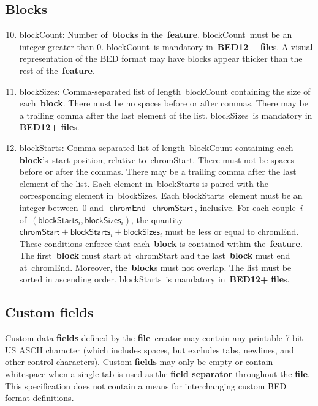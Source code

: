 \documentclass[11pt]{article}
\begin{document}
\subsection{Blocks}
\begin{enumerate}
  \setcounter{enumi}{9}

\item \textsf{blockCount}: Number of~\textbf{block}s in the~\textbf{feature}.
  \textsf{blockCount}~must be an integer greater than 0.
  \textsf{blockCount}~is mandatory in~\textbf{BED12+}~\textbf{file}s.
  A visual representation of the \ac{BED} format may have blocks appear thicker than the rest of the~\textbf{feature}.

\item \textsf{blockSizes}: Comma-separated list of length~\textsf{blockCount} containing the size of each~\textbf{block}.
  There must be no spaces before or after commas.
  There may be a trailing comma after the last element of the list.
  \textsf{blockSizes}~is mandatory in \textbf{BED12+} \textbf{file}s.

\item \textsf{blockStarts}: Comma-separated list of length~\textsf{blockCount} containing each \textbf{block}'s~start position, relative to~\textsf{chromStart}.
  There must not be spaces before or after the commas.
  There may be a trailing comma after the last element of the list.
  Each element in~\textsf{blockStarts} is paired with the corresponding element in~\textsf{blockSizes}.
  Each \textsf{blockStarts}~element must be an integer between~0 and~$\textsf{chromEnd} - \textsf{chromStart}$, inclusive.
  For each couple~$i$ of~$(\textsf{blockStarts}_i, \textsf{blockSizes}_i)$, the quantity~$\textsf{chromStart} + \textsf{blockStarts}_i + \textsf{blockSizes}_i$ must be less or equal to \textsf{chromEnd}.
  These conditions enforce that each~\textbf{block} is contained within the~\textbf{feature}.
  The first~\textbf{block} must start at~\textsf{chromStart} and the last~\textbf{block} must end at~\textsf{chromEnd}.
  Moreover, the~\textbf{block}s must not overlap.
  The list must be sorted in ascending order.
  \textsf{blockStarts}~is mandatory in~\textbf{BED12+} \textbf{file}s.
\end{enumerate}

\subsection{Custom fields}

Custom data \textbf{fields} defined by the \textbf{file}~creator may contain any printable 7-bit US \ac{ASCII} character (which includes spaces, but excludes tabs, newlines, and other control characters).
Custom \textbf{fields} may only be empty or contain whitespace when a single tab is used as the \textbf{field separator} throughout the \textbf{file}.
This specification does not contain a means for interchanging custom \ac{BED} format definitions.
\end{document}
